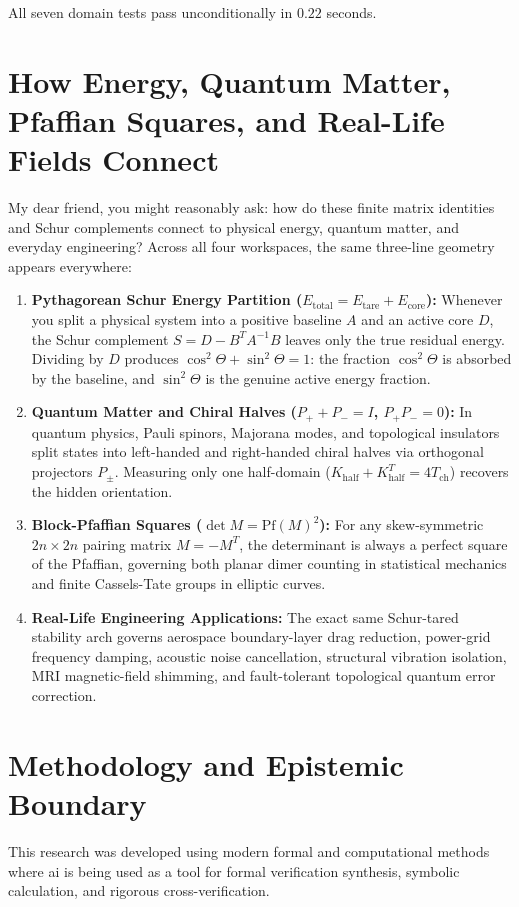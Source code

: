 \documentclass[11pt,a4paper]{article}
\theoremstyle{definition}
\begin{document}
All seven domain tests pass unconditionally in $0.22$ seconds.



\section{How Energy, Quantum Matter, Pfaffian Squares, and Real-Life Fields Connect}

My dear friend, you might reasonably ask: how do these finite matrix identities and Schur complements connect to physical energy, quantum matter, and everyday engineering? Across all four workspaces, the same three-line geometry appears everywhere:

\begin{enumerate}
  \item \textbf{Pythagorean Schur Energy Partition ($E_{\mathrm{total}} = E_{\mathrm{tare}} + E_{\mathrm{core}}$):} Whenever you split a physical system into a positive baseline $A$ and an active core $D$, the Schur complement $S = D - B^T A^{-1} B$ leaves only the true residual energy. Dividing by $D$ produces $\cos^2\Theta + \sin^2\Theta = 1$: the fraction $\cos^2\Theta$ is absorbed by the baseline, and $\sin^2\Theta$ is the genuine active energy fraction.
  \item \textbf{Quantum Matter and Chiral Halves ($P_+ + P_- = I$, $P_+ P_- = 0$):} In quantum physics, Pauli spinors, Majorana modes, and topological insulators split states into left-handed and right-handed chiral halves via orthogonal projectors $P_\pm$. Measuring only one half-domain ($K_{\mathrm{half}} + K_{\mathrm{half}}^T = 4 T_{\mathrm{ch}}$) recovers the hidden orientation.
  \item \textbf{Block-Pfaffian Squares ($\det M = \mathrm{Pf}(M)^2$):} For any skew-symmetric $2n \times 2n$ pairing matrix $M = -M^T$, the determinant is always a perfect square of the Pfaffian, governing both planar dimer counting in statistical mechanics and finite Cassels-Tate groups in elliptic curves.
  \item \textbf{Real-Life Engineering Applications:} The exact same Schur-tared stability arch governs aerospace boundary-layer drag reduction, power-grid frequency damping, acoustic noise cancellation, structural vibration isolation, MRI magnetic-field shimming, and fault-tolerant topological quantum error correction.
\end{enumerate}

\section{Methodology and Epistemic Boundary}
\noindent This research was developed using modern formal and computational methods where ai is being used as a tool for formal verification synthesis, symbolic calculation, and rigorous cross-verification.
\end{document}
